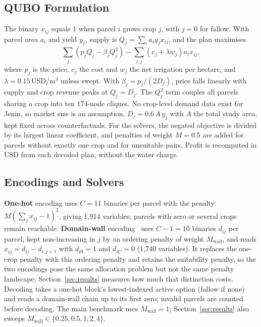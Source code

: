 \subsection{QUBO Formulation}
The binary $x_{ij}$ equals 1 when parcel $i$ grows crop $j$, with $j=0$ for
fallow. With parcel area $a_i$ and yield $y_j$, supply is
$Q_j = \sum_i a_i y_j x_{ij}$, and the plan maximises
\begin{equation}
\sum_j \left( p_j Q_j - \beta_j Q_j^2 \right)
- \sum_{i,j} \left( c_j + \lambda w_j \right) a_i x_{ij},
\label{eq:objective}
\end{equation}
where $p_j$ is the price, $c_j$ the cost and $w_j$ the net irrigation per
hectare, and $\lambda = 0.15$\,USD/m$^3$ unless swept. With
$\beta_j = p_j/(2D_j)$, price falls linearly with supply and crop revenue
peaks at $Q_j = D_j$. The $Q_j^2$ term couples all parcels sharing a crop
into ten 174-node cliques. No crop-level demand data exist for Jenin, so market size is an
assumption, $D_j = 0.6\,A\,y_j$ with $A$ the total study area, kept fixed
across counterfactuals. For the solvers, the negated objective is
divided by its largest linear coefficient, and penalties of weight $M = 0.5$
are added for parcels without exactly one crop and for unsuitable pairs.
Profit is recomputed in USD from each decoded plan, without the water
charge.

\subsection{Encodings and Solvers}
\textbf{One-hot} encoding uses $C = 11$ binaries per parcel with the penalty
$M(\sum_j x_{ij} - 1)^2$, giving 1{,}914 variables; parcels with zero or
several crops remain reachable. \textbf{Domain-wall}
encoding~\cite{chancellor2019} uses $C-1 = 10$ binaries $d_{ij}$ per
parcel, kept non-increasing in $j$ by an ordering penalty of weight
$M_{\mathrm{wall}}$, and reads $x_{ij} = d_{ij} - d_{i,j+1}$ with
$d_{i0} = 1$ and $d_{iC} = 0$ (1{,}740 variables). It replaces the one-crop penalty with this ordering penalty and retains the
suitability penalty, so the two encodings pose the same allocation problem but
not the same penalty landscape; Section~\ref{sec:results} measures how much
that distinction costs. Decoding takes a
one-hot block's lowest-indexed active option (fallow if none) and reads a
domain-wall chain up to its first zero; invalid parcels are counted before
decoding. The main
benchmark uses $M_{\mathrm{wall}} = 1$; Section~\ref{sec:results} also
sweeps $M_{\mathrm{wall}} \in \{0.25, 0.5, 1, 2, 4\}$.

